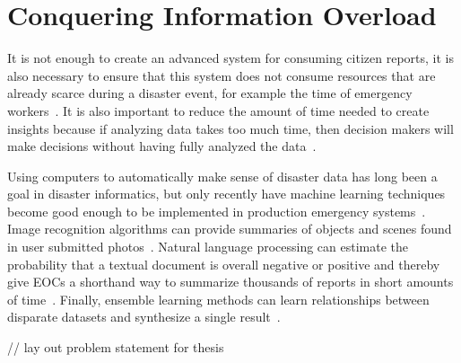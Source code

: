 \section{Conquering Information Overload} It is not enough to create an advanced
system for consuming citizen reports, it is also necessary to ensure that this
system does not consume resources that are already scarce during a disaster
event, for example the time of emergency
workers~\cite{aminDataNaturalDisasters2008}. It is also important to reduce the
amount of time needed to create insights because if analyzing data takes too
much time, then decision makers will make decisions without having fully
analyzed the data~\cite{quarantelliUrbanVulnerabilityDisasters2003}.

	Using computers to automatically make sense of disaster data has long
	been a goal in disaster informatics, but only recently have machine
	learning techniques become good enough to be implemented in production
	emergency systems~\cite{meierDigitalHumanitariansHow2015}. Image
	recognition algorithms can provide summaries of objects and scenes found
	in user submitted photos~\cite{nguyenRapidClassificationCrisisRelated,
	donahueDeCAFDeepConvolutional2013}. Natural language processing can
	estimate the probability that a textual document is overall negative or
	positive and thereby give EOCs a shorthand way to summarize thousands of
	reports in short amounts of
	time~\cite{nguyenRapidClassificationCrisisRelated,
	nagyCrowdSentimentDetection2012}. Finally, ensemble learning methods can
	learn relationships between disparate datasets and synthesize a single
	result~\cite{mouzannarDamageIdentificationSocial2018}.

	// lay out problem statement for thesis
